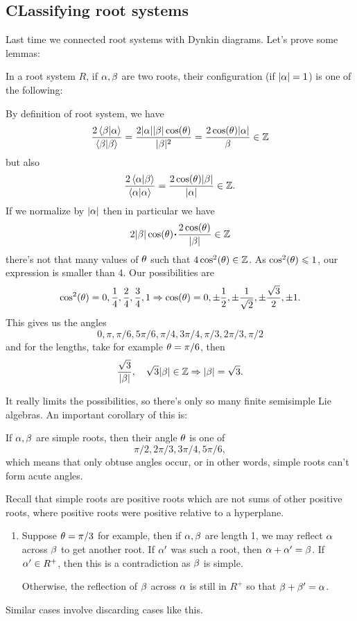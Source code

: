 \documentclass[12pt]{memoir}
\begin{document}
\subsection{CLassifying root systems}

Last time we connected root systems with Dynkin diagrams. Let's prove some lemmas:

\begin{Lem}
    In a root system $R$, if $\alpha,\beta$ are two roots, their configuration (if $|\alpha|=1$) is one of the following:
\end{Lem}

\begin{ptcbp}
    By definition of root system, we have 
    $$\frac{2\braket{\beta}{\alpha}}{\braket{\beta}{\beta}}=\frac{2|\alpha||\beta|\cos(\theta)}{|\beta|^2}=\frac{2\cos(\theta)|\alpha|}{\beta}\in\mathbb{Z}$$
    but also 
    $$\frac{2\braket{\alpha}{\beta}}{\braket{\alpha}{\alpha}}=\frac{2\cos(\theta)|\beta|}{|\alpha|}\in\mathbb{Z}.$$
    If we normalize by $|\alpha|$ then in particular we have 
    $$2|\bt|\cos(\te)\.\frac{2\cos(\te)}{|\bt|}\in\bZ$$
    there's not that many values of $\theta$ such that $4\cos^2(\theta)\in\mathbb{Z}$. As $\cos^2(\theta)\leqslant 1$, our expression is smaller than 4. Our possibilities are
    $$\cos^2(\te)=0,\frac{1}{4},\frac{2}{4},\frac{3}{4},1\To\cos(\te)=0,\pm\half,\pm\frac{1}{\sqrt{2}},\pm\frac{\sqrt{3}}{2},\pm 1.$$
    This gives us the angles
    $$0,\pi,\pi/6,5\pi/6,\pi/4,3\pi/4,\pi/3,2\pi/3,\pi/2$$
    and for the lengths, take for example $\theta=\pi/6$, then 
    $$\frac{\sqrt{3}}{|\beta|},\quad\sqrt{3}|\beta|\in\mathbb{Z}\Rightarrow|\beta|=\sqrt{3}.$$
\end{ptcbp}

It really limits the possibilities, so there's only so many finite semisimple Lie algebras. An important corollary of this is:

\begin{Cor}
    If $\alpha,\beta$ are simple roots, then their angle $\theta$ is one of 
    $$\pi/2,2\pi/3,3\pi/4,5\pi/6,$$
    which means that only obtuse angles occur, or in other words, simple roots can't form acute angles. 
\end{Cor}

\begin{ptcbp}
    Recall that simple roots are positive roots which are not sums of other positive roots, where positive roots were positive relative to a hyperplane.\par
    \begin{enumerate}
        \item Suppose $\theta=\pi/3$ for example, then if $\alpha,\beta$ are length 1, we may reflect $\alpha$ across $\beta$ to get another root. If $\alpha'$ was such a root, then $\alpha+\alpha'=\beta$. If $\alpha'\in R^+$, then this is a contradiction as $\beta$ is simple.\par
        Otherwise, the reflection of $\beta$ across $\alpha$ is still in $R^+$ so that $\beta+\beta'=\alpha$.  
    \end{enumerate}
    Similar cases involve discarding cases like this.
\end{ptcbp}
\end{document}
